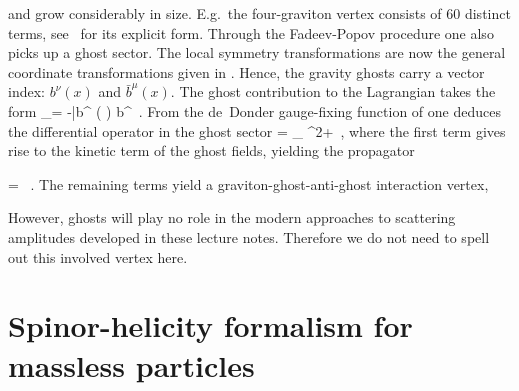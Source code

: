\ee
and grow considerably in size. E.g.~the four-graviton vertex consists of 60 distinct terms,
see~\cite{ch1_Sannan:1986tz} for its explicit form.
Through the Fadeev-Popov procedure one also picks up a ghost sector. The local symmetry transformations are now the general coordinate transformations given in . 
Hence, the gravity ghosts carry a vector index: $b^{\nu}(x)$ and $\bar b^{\mu}(x)$. The ghost contribution to the Lagrangian takes the form
%
\be
{}_{}= -\bar b^{\mu} \left( \kappa {} \right)  b^{\nu}\, .
\ee
%
From the de~Donder gauge-fixing function of  one deduces the differential operator in the ghost sector
%
\be
\kappa{} =  \eta_{\mu\nu} \partial^{2}+
\kappa {} \,,
\ee
%
where the first term gives rise to the kinetic term of the ghost fields, yielding the propagator
%
\be
{}
= \, .
\ee
%
The remaining terms yield a graviton-ghost-anti-ghost interaction vertex,
%
\be
{} 	\ee
%
However, ghosts will play no role in the modern approaches to scattering amplitudes 
developed in these lecture notes. Therefore we do not need to spell out this involved
vertex here.


\section{Spinor-helicity formalism for massless particles}
\label{sec:1.7}

